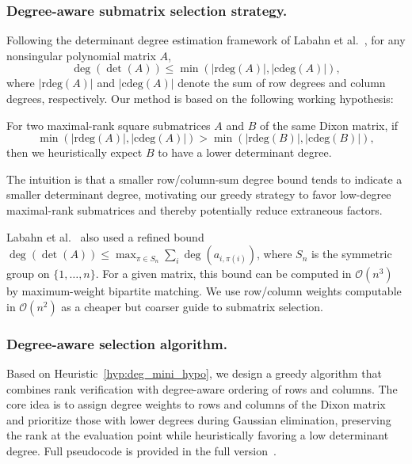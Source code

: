 \subsubsection{Degree-aware submatrix selection strategy.}
Following the determinant degree estimation framework of Labahn et al.~\cite{DBLP:journals/jc/LabahnNZ17}, for any nonsingular polynomial matrix $A$,
\begin{equation*}
	\deg(\det(A)) \leq \min(|\mathrm{rdeg}(A)|, |\mathrm{cdeg}(A)|),
\end{equation*}
where $|\mathrm{rdeg}(A)|$ and $|\mathrm{cdeg}(A)|$ denote the sum of row degrees and column degrees, respectively. Our method is based on the following working hypothesis:

\begin{hypothesis}\label{hyp:deg_mini_hypo}
	For two maximal-rank square submatrices $A$ and $B$ of the same Dixon matrix, if
    \[
      \min(|\mathrm{rdeg}(A)|,|\mathrm{cdeg}(A)|)
      >
      \min(|\mathrm{rdeg}(B)|,|\mathrm{cdeg}(B)|),
    \]
    then we heuristically expect $B$ to have a lower determinant degree.
\end{hypothesis}

The intuition is that a smaller row/column-sum degree bound tends to indicate a smaller determinant degree, motivating our greedy strategy to favor low-degree maximal-rank submatrices and thereby potentially reduce extraneous factors.

\begin{remark}
	Labahn et al.~\cite{DBLP:journals/jc/LabahnNZ17} also used a refined bound $\deg(\det(A)) \le \max_{\pi \in S_n} \sum_{i} \deg(a_{i,\pi(i)})$, where $S_n$ is the symmetric group on $\{1,\ldots,n\}$. For a given matrix, this bound can be computed in $\mathcal{O}(n^3)$ by maximum-weight bipartite matching. We use row/column weights computable in $\mathcal{O}(n^2)$ as a cheaper but coarser guide to submatrix selection.
\end{remark}

\subsubsection{Degree-aware selection algorithm.}
Based on Heuristic~\ref{hyp:deg_mini_hypo}, we design a greedy algorithm that combines rank verification with degree-aware ordering of rows and columns. The core idea is to assign degree weights to rows and columns of the Dixon matrix and prioritize those with lower degrees during Gaussian elimination, preserving the rank at the evaluation point while heuristically favoring a low determinant degree. Full pseudocode is provided in the full version~\cite{cryptoeprint:2026/1969}.

